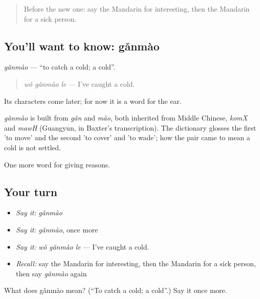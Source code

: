 \label{lesson:ZH-C130-ganmao}



\begin{quote}
Before the new one: say the Mandarin for interesting, then the Mandarin for a sick person.
\end{quote}

\subsection*{You'll want to know: gǎnmào}
\emph{gǎnmào} — \textquotedblleft{}to catch a cold; a cold\textquotedblright{}.

\begin{quote}
\emph{wǒ gǎnmào le} — I've caught a cold.
\end{quote}

Its characters come later; for now it is a word for the ear.

\begin{cousinweb}
\emph{gǎnmào} is built from \emph{gǎn} and \emph{mào}, both inherited from Middle Chinese, \emph{komX} and \emph{mawH} (Guangyun, in Baxter's transcription). The dictionary glosses the first 'to move' and the second 'to cover' and 'to wade'; how the pair came to mean a cold is not settled.
\end{cousinweb}

\begin{grammarlens}[title={What you've built}]
One more word for giving reasons.
\end{grammarlens}

\subsection*{Your turn}
\begin{itemize}
\raggedright
  \item \emph{Say it:} \emph{gǎnmào}
  \item \emph{Say it:} \emph{gǎnmào}, once more
  \item \emph{Say it:} \emph{wǒ gǎnmào le} — I've caught a cold.
  \item \emph{Recall:} say the Mandarin for interesting, then the Mandarin for a sick person, then say \emph{gǎnmào} again
\end{itemize}

\begin{tcolorbox}[breakable,colback=teal!4,colframe=teal!35!black,title={Before you move on}]
What does gǎnmào mean? (\textquotedblleft{}To catch a cold; a cold\textquotedblright{}.) Say it once more.
\end{tcolorbox}
